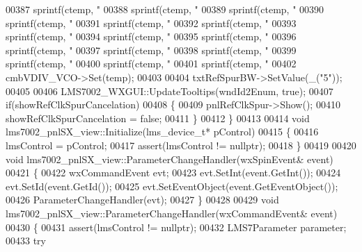 \begin{DoxyCode}
{{{{{{{{{{{{{{{{{{{{{{{{{{{{{{{{{{{{{{{{{{{{{{{{{{{{{{{{{{{{{{{{{{{{{{{{{{{{{{{{{{{{{{{{{{{{{{{{{{{{{{{{{{{{{{{{{{{{{{{{{{{{{{{{{{{{{{{{{{{{{{{{{{{{{{{{{{{{{{{{{{{{{{{{{{{{{{{{{{{{{{{{{{{{{{{{{{{{{{{{{{{{{{{{{{{{{{{{{{{{{{{{{{{{{{{{{{{{{{{{{{{{{{{00387     sprintf(ctemp, \textcolor{stringliteral}{"%
00388     sprintf(ctemp, \textcolor{stringliteral}{"%
00389     sprintf(ctemp, \textcolor{stringliteral}{"%
00390     sprintf(ctemp, \textcolor{stringliteral}{"%
00391     sprintf(ctemp, \textcolor{stringliteral}{"%
00392     sprintf(ctemp, \textcolor{stringliteral}{"%
00393     sprintf(ctemp, \textcolor{stringliteral}{"%
00394     sprintf(ctemp, \textcolor{stringliteral}{"%
00395     sprintf(ctemp, \textcolor{stringliteral}{"%
00396     sprintf(ctemp, \textcolor{stringliteral}{"%
00397     sprintf(ctemp, \textcolor{stringliteral}{"%
00398     sprintf(ctemp, \textcolor{stringliteral}{"%
00399     sprintf(ctemp, \textcolor{stringliteral}{"%
00400     sprintf(ctemp, \textcolor{stringliteral}{"%
00401     sprintf(ctemp, \textcolor{stringliteral}{"%
00402     cmbVDIV_VCO->Set(temp);
00403 
00404     txtRefSpurBW->SetValue(\_(\textcolor{stringliteral}{"5"}));
00405 
00406     LMS7002_WXGUI::UpdateTooltips(wndId2Enum, \textcolor{keyword}{true});
00407     \textcolor{keywordflow}{if}(showRefClkSpurCancelation)
00408     \{
00409         pnlRefClkSpur->Show();
00410         showRefClkSpurCancelation = \textcolor{keyword}{false};
00411     \}
00412 \}
00413 
00414 \textcolor{keywordtype}{void} lms7002_pnlSX_view::Initialize(lms_device_t* pControl)
00415 \{
00416     lmsControl = pControl;
00417     assert(lmsControl != \textcolor{keyword}{nullptr});
00418 \}
00419 
00420 \textcolor{keywordtype}{void} lms7002_pnlSX_view::ParameterChangeHandler(wxSpinEvent& event)
00421 \{
00422     wxCommandEvent evt;
00423     evt.SetInt(event.GetInt());
00424     evt.SetId(event.GetId());
00425     evt.SetEventObject(event.GetEventObject());
00426     ParameterChangeHandler(evt);
00427 \}
00428 
00429 \textcolor{keywordtype}{void} lms7002_pnlSX_view::ParameterChangeHandler(wxCommandEvent& event)
00430 \{
00431     assert(lmsControl != \textcolor{keyword}{nullptr});
00432     LMS7Parameter parameter;
00433     \textcolor{keywordflow}{try}
}}}}}}}}}}}}}}}}}}}}}}}}}}}}}}}}}}}}}}}}}}}}}}}}}}}}}}}}}}}}}}}}}}}}}}}}}}}}}}}}}}}}}}}}}}}}}}}}}}}}}}}}}}}}}}}}}}}}}}}}}}}}}}}}}}}}}}}}}}}}}}}}}}}}}}}}}}}}}}}}}}}}}}}}}}}}}}}}}}}}}}}}}}}}}}}}}}}}}}}}}}}}}}}}}}}}}}}}}}}}}}}}}}}}}}}}}}}}}}}}}}}}}}}}}}}}}}}}}}}}}}
\end{DoxyCode}
